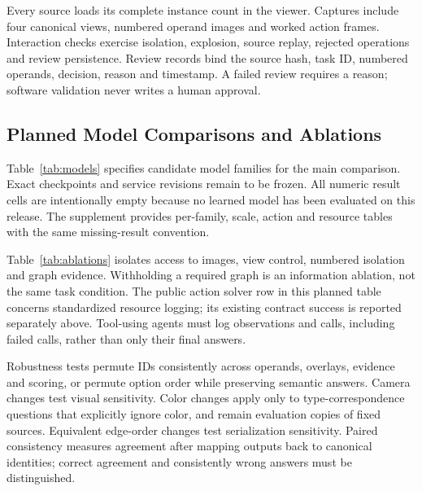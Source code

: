 \documentclass[10pt,twocolumn,letterpaper]{article}
\begin{document}
Every source loads its complete instance count in the viewer. Captures
include four canonical views, numbered operand images and worked
action frames. Interaction checks exercise isolation, explosion, source
replay, rejected operations and review persistence. Review records
bind the source hash, task ID, numbered operands, decision, reason and
timestamp. A failed review requires a reason; software validation never
writes a human approval.

\subsection{Planned Model Comparisons and Ablations}
Table~\ref{tab:models} specifies candidate model families for the main
comparison. Exact checkpoints and service revisions remain to be
frozen. All numeric result cells are intentionally empty because no
learned model has been evaluated on this release. The supplement
provides per-family, scale, action and resource tables with the same
missing-result convention.

\begin{table}[t]
\centering\small
\caption{Proposed learned-model comparison: exact success (\%) on
designated inputs. V/S/G/E are modality scores; Macro averages sources.
Candidate families are planning entries, not completed runs.
All blank result cells mean \emph{not run}.}
\label{tab:models}

\end{table}

Table~\ref{tab:ablations} isolates access to images, view control,
numbered isolation and graph evidence. Withholding a required graph is
an information ablation, not the same task condition. The public action
solver row in this planned table concerns standardized resource
logging; its existing contract success is reported separately above.
Tool-using agents must log observations and calls, including failed
calls, rather than only their final answers.

\begin{table}[t]
\centering\small
\caption{Proposed information and tool ablations. Acc.\ and Valid
are percentages; Calls is mean tool calls per task. Each comparison
uses a frozen model and its eligible subset. Cells are unrun.}
\label{tab:ablations}

\end{table}

Robustness tests permute IDs consistently across operands, overlays,
evidence and scoring, or permute option order while preserving semantic
answers. Camera changes test visual sensitivity. Color changes apply
only to type-correspondence questions that explicitly ignore color,
and remain evaluation copies of fixed sources. Equivalent edge-order
changes test serialization sensitivity. Paired consistency measures
agreement after mapping outputs back to canonical identities; correct
agreement and consistently wrong answers must be distinguished.
\end{document}
